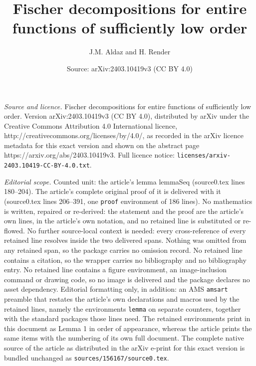 \documentclass[10pt,a4paper]{amsart}
\title{Fischer decompositions for entire functions of sufficiently low order}
\author{J.M. Aldaz and H. Render}
\date{Source: arXiv:2403.10419v3 (CC BY 4.0)}
\begin{document}
\maketitle

\noindent\emph{Source and licence.} Fischer decompositions for entire functions of sufficiently low order. Version arXiv:2403.10419v3 (CC BY 4.0), distributed by arXiv under the Creative Commons Attribution 4.0 International licence, http://creativecommons.org/licenses/by/4.0/, as recorded in the arXiv licence metadata for this exact version and shown on the abstract page https://arxiv.org/abs/2403.10419v3. Full licence notice: \texttt{licenses/arxiv-2403.10419-CC-BY-4.0.txt}.\par\smallskip

\noindent\textit{Editorial scope.} Counted unit: the article's lemma lemmaSeq (source0.tex lines 180--204). The article's complete original proof of it is delivered with it (source0.tex lines 206--391, one \texttt{proof} environment of 186 lines). No mathematics is written, repaired or re-derived: the statement and the proof are the article's own lines, in the article's own notation, and no retained line is substituted or re-flowed.  No further source-local context is needed: every cross-reference of every retained line resolves inside the two delivered spans.  Nothing was omitted from any retained span, so the package carries no omission record.  No retained line contains a citation, so the wrapper carries no bibliography and no bibliography entry.  No retained line contains a figure environment, an image-inclusion command or drawing code, so no image is delivered and the package declares no asset dependency.  Editorial formatting only, in addition: an AMS \texttt{amsart} preamble that restates the article's own declarations and macros used by the retained lines, namely the environments \texttt{lemma} on separate counters, together with the standard packages those lines need.  The retained environments print in this document as Lemma 1 in order of appearance, whereas the article prints the same items with the numbering of its own full document.  The complete native source of the article as distributed in the arXiv e-print for this exact version is bundled unchanged as \texttt{sources/156167/source0.tex}.
\end{document}

